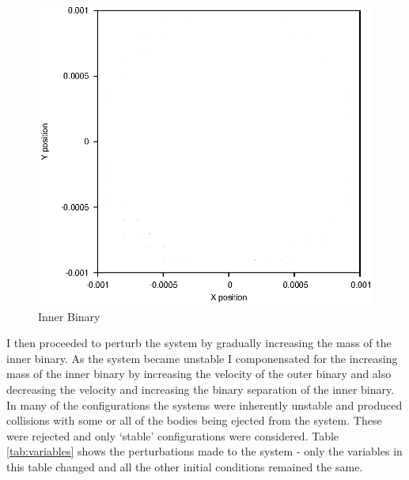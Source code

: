 \documentclass[a4paper,12pt]{article}
\begin{document}
\begin{figure}[H]
\centering
\includegraphics[width=.9\textwidth]{./2016results/innerbinary/Orbit.eps}
\caption{Inner Binary}
\label{fig:innerbinary}
\end{figure}
I then proceeded to perturb the system by gradually increasing the mass of the inner binary. As the system became unstable I componensated for
the increasing mass of the inner binary by increasing the velocity of the outer binary and also decreasing the velocity and increasing the binary 
separation of the inner binary. In many of the configurations the systems were inherently unstable and produced collisions with some 
or all of the bodies being ejected from the system. These were rejected and only `stable' configurations were considered.
Table \ref{tab:variables} shows the perturbations made to the system - only the variables in this table changed and all the other initial
conditions remained the same.
\end{document}
